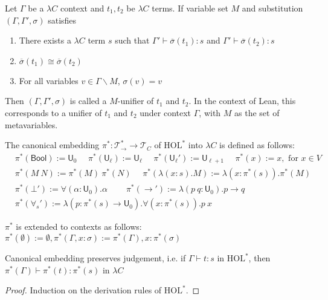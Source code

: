 \begin{definition} Let $\Gamma$ be a $\lambda C$ context and $t_1, t_2$ be $\lambda C$ terms.
  If variable set $M$ and substitution $(\Gamma, \Gamma', \sigma)$ satisfies
  \begin{enumerate}
    \item There exists a $\lambda C$ term $s$ such that $\Gamma' \vdash \overline{\sigma}(t_1) : s$ and $\Gamma' \vdash \overline{\sigma}(t_2) : s$
    \item $\overline{\sigma}(t_1) \cong \overline{\sigma}(t_2)$
    \item For all variables $v \in \Gamma \backslash M$, $\sigma(v) = v$
  \end{enumerate}
  Then $(\Gamma, \Gamma', \sigma)$ is called a $M$-unifier of $t_1$ and $t_2$. In the context of Lean,
  this corresponds to a unifier of $t_1$ and $t_2$ under context $\Gamma$, with $M$ as the set of metavariables.
\end{definition}

\begin{definition} The canonical embedding $\pi^* : \mathcal{T}_\to^* \to \mathcal{T}_C$ of $\text{HOL}^*$ into $\lambda C$ is defined as follows:
  $$\begin{aligned}
  & \pi^*(\mathsf{Bool}) := \mathsf{U}_0 \ \ \ \ \ \ \pi^*(\mathsf{U}_\ell) := \mathsf{U}_\ell \ \ \ \ \ \
    \pi^*(\mathsf{U}_\ell') := \mathsf{U}_{\ell + 1} \ \ \ \ \ \ \pi^*(x) := x, \text{ for } x \in V \\
    & \pi^*(M \ N) := \pi^*(M) \ \pi^*(N) \ \ \ \ \ \ \pi^*(\lambda (x : s). M) := \lambda (x : \pi^*(s)). \pi^*(M) \\
  & \pi^*(\bot') := \forall (\alpha : \mathsf{U}_0). \alpha \ \ \ \ \ \ \ \ \ \
  \pi^*(\to') := \lambda (p \ q : \mathsf{U}_0). p \to q \\
  & \pi^*(\forall_s') := \lambda (p : \pi^*(s) \to \mathsf{U}_0). \forall (x : \pi^*(s)). p \ x
  \end{aligned}$$

  \noindent $\pi^*$ is extended to contexts as follows: $\pi^*(\emptyset) := \emptyset, \pi^*(\Gamma, x : \sigma) := \pi^*(\Gamma), x : \pi^*(\sigma)$


\end{definition}

\begin{theorem}\label{ceptj} Canonical embedding preserves judgement, i.e. if $\Gamma \vdash t : s$ in $\text{HOL}^*$, then
  $\pi^*(\Gamma) \vdash \pi^*(t) : \pi^*(s)$ in $\lambda C$ \end{theorem}
\begin{proof} Induction on the derivation rules of $\text{HOL}^*$. \end{proof}

